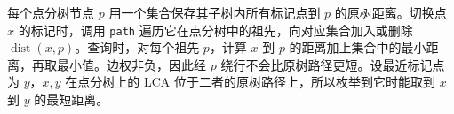 每个点分树节点 $p$ 用一个集合保存其子树内所有标记点到 $p$ 的原树距离。切换点 $x$ 的标记时，调用 \texttt{path} 遍历它在点分树中的祖先，向对应集合加入或删除 $\operatorname{dist}(x,p)$。查询时，对每个祖先 $p$，计算 $x$ 到 $p$ 的距离加上集合中的最小距离，再取最小值。边权非负，因此经 $p$ 绕行不会比原树路径更短。设最近标记点为 $y$，$x,y$ 在点分树上的 LCA 位于二者的原树路径上，所以枚举到它时能取到 $x$ 到 $y$ 的最短距离。
